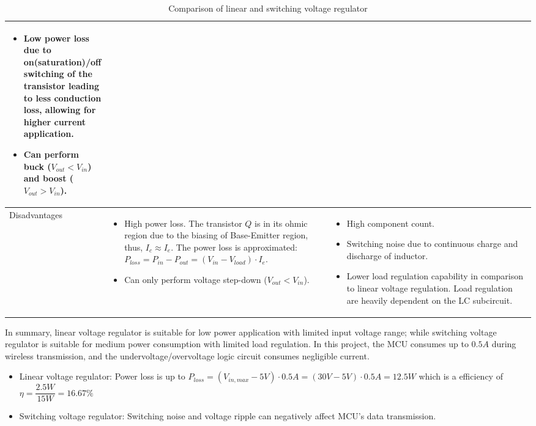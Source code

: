 \documentclass[../main.tex]{subfiles}
\begin{document}
\begin{table}[!h]
\begin{tabular}{|m{0.1\linewidth}|m{0.45\linewidth}|m{0.45\linewidth}|}
        \begin{itemize}
            \item Low power loss due to on(saturation)/off switching of the transistor leading to less conduction loss, allowing for higher current application.
            \item Can perform buck ($V_{out} < V_{in}$) and boost ($V_{out} > V_{in}$).
        \end{itemize} \\

        \hline
        Disadvantages & 

        \begin{itemize}
            \item High power loss. The transistor $Q$ is in its ohmic region due to the biasing of Base-Emitter region, thus, $I_{c} \approx I_{e}$. The power loss is approximated: \newline $P_{loss} = P_{in} - P_{out} = (V_{in} - V_{load}) \cdot I_{e}$.
            \item Can only perform voltage step-down ($V_{out} < V_{in}$).
        \end{itemize} &
        
        \begin{itemize}
            \item High component count.
            \item Switching noise due to continuous charge and discharge of inductor.
            \item Lower load regulation capability in comparison to linear voltage regulation. Load regulation are heavily dependent on the LC subcircuit. 
        \end{itemize}  \\

        \hline     
        \end{tabular}
        \caption{Comparison of linear and switching voltage regulator}
        \label{table:voltage_regulator_type}
    \end{table}

    \justify
    In summary, linear voltage regulator is suitable for low power application with limited input voltage range; while switching voltage regulator is suitable for medium power consumption with limited load regulation. In this project, the MCU consumes up to $0.5A$ during wireless transmission, and the undervoltage/overvoltage logic circuit consumes negligible current.

    \begin{itemize}
        \item Linear voltage regulator: Power loss is up to $P_{loss} = (V_{in,max} - 5V) \cdot 0.5A = (30V - 5V) \cdot 0.5A = 12.5W$ which is a efficiency of $\eta = \dfrac{2.5W}{15W} = 16.67\%$
        \item Switching voltage regulator: Switching noise and voltage ripple can negatively affect MCU's data transmission.
    \end{itemize}
    
\end{document}
